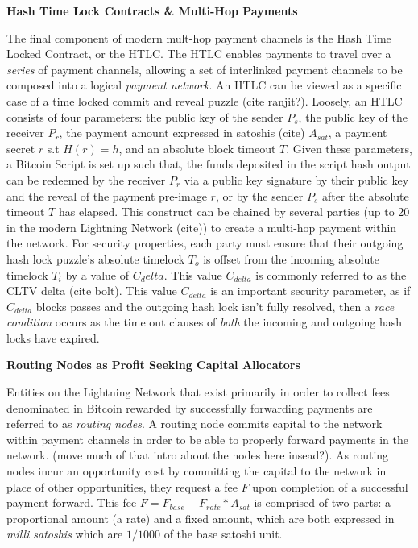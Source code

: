 \documentclass[12pt,a4paper]{article}
\theoremstyle{definition}
\begin{document}
\begin{center}
\textbf{Hash Time Lock Contracts \& Multi-Hop Payments}
\end{center}


The final component of modern mult-hop payment channels is the Hash Time Locked
Contract, or the HTLC. The HTLC enables payments to travel over a \emph{series}
of payment channels, allowing a set of interlinked payment channels to be
composed into a logical \emph{payment network}. An HTLC can be viewed as a
specific case of a time locked commit and reveal puzzle (cite ranjit?).
Loosely, an HTLC consists of four parameters: the public key of the sender
$P_{s}$, the public key of the receiver $P_{r}$, the payment amount expressed
in satoshis (cite) $A_{sat}$, a payment secret $r$ s.t $H(r) = h$, and an
absolute block timeout $T$. Given these parameters, a Bitcoin Script is set up
such that, the funds deposited in the script hash output can be redeemed by the
receiver $P_{r}$ via a public key signature by their public key and the reveal
of the payment pre-image $r$, or by the sender $P_{s}$ after the absolute
timeout $T$ has elapsed. This construct can be chained by several parties (up
to 20 in the modern Lightning Network (cite)) to create a multi-hop payment
within the network. For security properties, each party must ensure that their
outgoing hash lock puzzle's absolute timelock $T_o$ is offset from the incoming
absolute timelock $T_i$ by a value of $C_delta$. This value $C_{delta}$ is
commonly referred to as the CLTV delta (cite bolt). This value $C_{delta}$ is
an important security parameter, as if $C_{delta}$ blocks passes and the
outgoing hash lock isn't fully resolved, then a \emph{race condition} occurs as
the time out clauses of \emph{both} the incoming and outgoing hash locks have
expired. \\

\begin{center}
\textbf{Routing Nodes as Profit Seeking Capital Allocators}
\end{center}

Entities on the Lightning Network that exist primarily in order to collect fees
denominated in Bitcoin rewarded by successfully forwarding payments are
referred to as \emph{routing nodes}. A routing node commits capital to the
network within payment channels in order to be able to properly forward
payments in the network. (move much of that intro about the nodes here
insead?). As routing nodes incur an opportunity cost by committing the capital
to the network in place of other opportunities, they request a fee $F$ upon
completion of a successful payment forward. This fee $F = F_{base} +
F_{rate}*A_{sat}$ is comprised of two parts: a proportional amount (a rate) and
a fixed amount, which are both expressed in \emph{milli satoshis} which are
$1/1000$ of the base satoshi unit.
\end{document}
